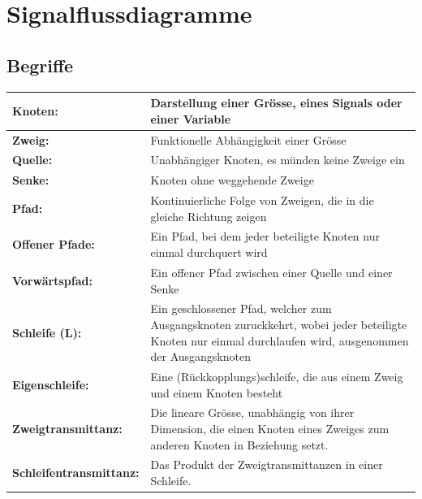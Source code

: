 
\section{Signalflussdiagramme}
\subsection{Begriffe}
\begin{tabular}{|p{}|p{}|}
    \hline
    \textbf{Knoten:}                &
    Darstellung einer Grösse, eines Signals oder einer Variable
    \\
    \hline
    \textbf{Zweig:}                 &
    Funktionelle Abhängigkeit einer Grösse
    \\
    \hline
    \textbf{Quelle:}                &
    Unabhängiger Knoten, es münden keine Zweige ein
    \\
    \hline
    \textbf{Senke:}                 &
    Knoten ohne weggehende Zweige
    \\
    \hline
    \textbf{Pfad:}                  &
    Kontinuierliche Folge von Zweigen, die in die gleiche Richtung zeigen
    \\
    \hline
    \textbf{Offener Pfade:}         &
    Ein Pfad, bei dem jeder beteiligte Knoten nur einmal durchquert wird
    \\
    \hline
    \textbf{Vorwärtspfad:}          &
    Ein offener Pfad zwischen einer Quelle und einer Senke
    \\
    \hline
    \textbf{Schleife (L):}          &
    Ein geschlossener Pfad, welcher zum Ausgangsknoten zuruckkehrt, wobei jeder beteiligte
    Knoten nur einmal durchlaufen wird, ausgenommen der Ausgangsknoten
    \\
    \hline
    \textbf{Eigenschleife:}         &
    Eine (Rückkopplungs)schleife, die aus einem Zweig und einem Knoten besteht
    \\
    \hline
    \textbf{Zweigtransmittanz:}     &
    Die lineare Grösse, unabhängig von ihrer Dimension, die einen Knoten eines Zweiges zum
    anderen Knoten in Beziehung setzt.
    \\
    \hline
    \textbf{Schleifentransmittanz:} &
    Das Produkt der Zweigtransmittanzen in einer Schleife.
    \\
    \hline
\end{tabular}

